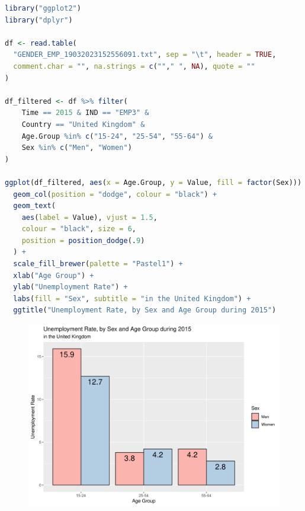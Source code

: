 \documentclass[12pt,a4paper]{article}
\begin{document}
\begin{lstlisting}[language=R]
library("ggplot2")
library("dplyr")

df <- read.table(
  "GENDER_EMP_19032023152556091.txt", sep = "\t", header = TRUE,
  comment.char = "", na.strings = c(""," ", NA), quote = ""
)

df_filtered <- df %>% filter(
    Time == 2015 & IND == "EMP3" &
    Country == "United Kingdom" &
    Age.Group %in% c("15-24", "25-54", "55-64") &
    Sex %in% c("Men", "Women")
)

ggplot(df_filtered, aes(x = Age.Group, y = Value, fill = factor(Sex))) +
  geom_col(position = "dodge", colour = "black") +
  geom_text(
    aes(label = Value), vjust = 1.5,
    colour = "black", size = 6,
    position = position_dodge(.9)
  ) +
  scale_fill_brewer(palette = "Pastel1") +
  xlab("Age Group") +
  ylab("Unemployment Rate") +
  labs(fill = "Sex", subtitle = "in the United Kingdom") +
  ggtitle("Unemployment Rate, by Sex and Age Group during 2015")
\end{lstlisting}

\qquad

\begin{figure}[h]
  \centering
  \includegraphics[scale = 0.8]{./ex03.png}
\end{figure}
\end{document}

